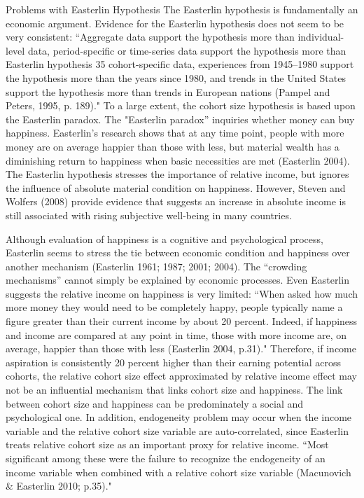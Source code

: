 Problems with Easterlin Hypothesis
The Easterlin hypothesis is fundamentally an economic argument. Evidence for the Easterlin hypothesis does not seem to be very consistent: “Aggregate data support the hypothesis more than individual-level data, period-specific or time-series data support the hypothesis more than Easterlin hypothesis 35 cohort-specific data, experiences from 1945–1980 support the hypothesis more than the years since 1980, and trends in the United States support the hypothesis more than trends in European nations (Pampel and Peters, 1995, p. 189)." To a large extent, the cohort size hypothesis is based upon the Easterlin paradox. The "Easterlin paradox” inquiries whether money can buy happiness. Easterlin’s research shows that at any time point, people with more money are on average happier than those with less, but material wealth has a diminishing return to happiness when basic necessities are met (Easterlin 2004). The Easterlin hypothesis stresses the importance of relative income, but ignores the influence of absolute material condition on happiness. However, Steven and Wolfers (2008) provide evidence that suggests an increase in absolute income is still associated with rising subjective well-being in many countries.

Although evaluation of happiness is a cognitive and psychological process, Easterlin seems to stress the tie between economic condition and happiness over another mechanism (Easterlin 1961; 1987; 2001; 2004). The “crowding mechanisms” cannot simply be explained by economic processes. Even Easterlin suggests the relative income on happiness is very limited: “When asked how much more money they would need to be completely happy, people typically name a figure greater than their current income by about 20 percent. Indeed, if happiness and income are compared at any point in time, those with more income are, on average, happier than those with less (Easterlin 2004, p.31)." Therefore, if income aspiration is consistently 20 percent higher than their earning potential across cohorts, the relative cohort size effect approximated by relative income effect may not be an influential mechanism that links cohort size and happiness. The link between cohort size and happiness can be predominately a social and psychological one. In addition, endogeneity problem may occur when the income variable and the relative cohort size variable are auto-correlated, since Easterlin treats relative cohort size as an important proxy for relative income. “Most significant among these were the failure to recognize the endogeneity of an income variable when combined with a relative cohort size variable (Macunovich & Easterlin 2010; p.35)."

